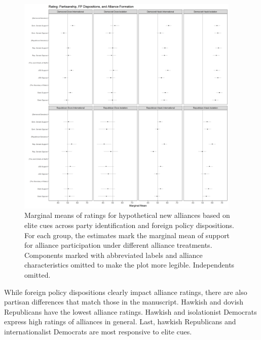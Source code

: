\documentclass[12pt]{article}
\begin{document}
\begin{figure}
	\centering
		\includegraphics[width=0.95\textwidth]{party-dispo-formapp.png}
	\caption{Marginal means of ratings for hypothetical new alliances based on elite cues across party identification and foreign policy dispositions. For each group, the estimates mark the marginal mean of support for alliance participation under different alliance treatments. Components marked with abbreviated labels and alliance characteristics omitted to make the plot more legible. Independents omitted.}
	\label{fig:party-dispo-form}
\end{figure}


While foreign policy dispositions clearly impact alliance ratings, there are also partisan differences that match those in the manuscript. 
Hawkish and dovish Republicans have the lowest alliance ratings. 
Hawkish and isolationist Democrats express high ratings of alliances in general.  
Last, hawkish Republicans and internationalist Democrats are most responsive to elite cues. 
\end{document}

